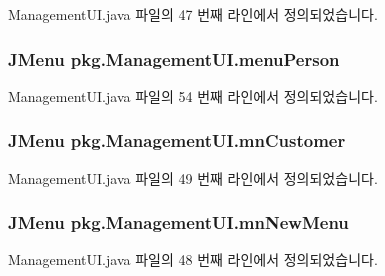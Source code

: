 Management\+U\+I.\+java 파일의 47 번째 라인에서 정의되었습니다.

\subsubsection[{\texorpdfstring{menu\+Person}{menuPerson}}]{\setlength{\rightskip}{0pt plus 5cm}J\+Menu pkg.\+Management\+U\+I.\+menu\+Person\hspace{0.3cm}{\ttfamily [private]}}\hypertarget{classpkg_1_1_management_u_i_aac445016414136b78a968311480e8308}{}\label{classpkg_1_1_management_u_i_aac445016414136b78a968311480e8308}


Management\+U\+I.\+java 파일의 54 번째 라인에서 정의되었습니다.

\subsubsection[{\texorpdfstring{mn\+Customer}{mnCustomer}}]{\setlength{\rightskip}{0pt plus 5cm}J\+Menu pkg.\+Management\+U\+I.\+mn\+Customer\hspace{0.3cm}{\ttfamily [private]}}\hypertarget{classpkg_1_1_management_u_i_a0c7fb8ff1b3734316fe7bc49221a5814}{}\label{classpkg_1_1_management_u_i_a0c7fb8ff1b3734316fe7bc49221a5814}


Management\+U\+I.\+java 파일의 49 번째 라인에서 정의되었습니다.

\subsubsection[{\texorpdfstring{mn\+New\+Menu}{mnNewMenu}}]{\setlength{\rightskip}{0pt plus 5cm}J\+Menu pkg.\+Management\+U\+I.\+mn\+New\+Menu\hspace{0.3cm}{\ttfamily [private]}}\hypertarget{classpkg_1_1_management_u_i_a02082701769fb188544b2211ebc5f759}{}\label{classpkg_1_1_management_u_i_a02082701769fb188544b2211ebc5f759}


Management\+U\+I.\+java 파일의 48 번째 라인에서 정의되었습니다.

